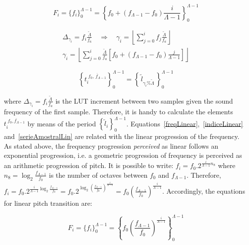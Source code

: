 \begin{equation}\label{freqLinear}
 F_i=\{f_i\}_0^{\Lambda-1}=\left\{f_0 + (f_{\Lambda-1}-f_0)\frac{i}{\Lambda-1} \right\}_0^{\Lambda-1}
\end{equation}

\begin{equation}\label{indiceLinear}
\begin{split}
 \Delta_{\gamma_i}=f_i\frac{\widetilde{\Lambda}}{f_a} \quad \Rightarrow \quad \gamma_i= \left \lfloor \sum_{j=0}^{i} f_j\frac{\widetilde{\Lambda}}{f_a} \right \rfloor \\
\gamma_i=  \left \lfloor \sum_{j=0}^{i} \frac{\widetilde{\Lambda}}{f_a} \left [f_0 + (f_{\Lambda-1}-f_0)\frac{j}{\Lambda-1} \right ] \right \rfloor 
\end{split}
\end{equation}

\begin{equation}\label{serieAmostralLin}
 \left\{t_i^{\;\overline{f_0,\, f_{\Lambda-1}}}\right\}_0^{\Lambda-1}=\left\{\,\widetilde{l}_{\gamma_i \% \widetilde{\Lambda}}\,\right\}_0^{\Lambda-1}
\end{equation}

\noindent where $\Delta_{\gamma_i}=f_i\frac{\widetilde{\Lambda}}{f_a}$ is the LUT increment between two samples given the sound frequency of the first sample. Therefore, it is handy to calculate the elements $t_i^{\;\overline{f_0,f_{\Lambda-1}}}$ by means of the period $\left\{\widetilde{l}_i\right\}_0^{\Lambda-1}$. Equations~\ref{freqLinear},~\ref{indiceLinear} and~\ref{serieAmostralLin} are related with the linear progression of the frequency. As stated above, the frequency progression \emph{perceived} as linear follows an exponential progression, i.e. a geometric progression of frequency is perceived as an arithmetic progression of pitch. It is possible to write: $f_i=f_0 . 2^{\frac{i}{\Lambda-1} n_8}$ where $n_8=\log_2\frac{f_{\Lambda-1}}{f_0}$ is the number of octaves between $f_0$ and $f_{\Lambda-1}$.
Therefore, $f_i=f_0 . 2^{\frac{i}{\Lambda-1}\log_2\frac{f_{\Lambda-1}}{f_0}}=
 f_0 . 2^{\log_2\left ( \frac{f_{\Lambda-1}}{f_0} \right )^{\frac{i}{\Lambda-1}}}=
 f_0 \left ( \frac{f_{\Lambda-1}}{f_0} \right ) ^{\frac{i}{\Lambda -1}}$. Accordingly, the equations for linear pitch transition are:

\begin{equation}\label{freqExponencial}
 F_i=\{f_i\}_0^{\Lambda-1}=  \left\{f_0 \left ( \frac{f_{\Lambda-1}}{f_0} \right ) ^{\frac{i}{\Lambda -1}} \right\}_0^{\Lambda-1}
\end{equation}

